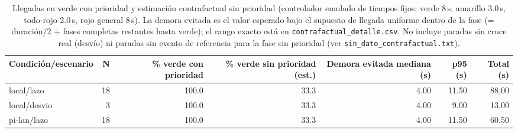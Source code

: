 \begin{table}[H]
\centering
\caption{Llegadas en verde con prioridad y estimación contrafactual sin prioridad (controlador emulado de tiempos fijos: verde 8\,s, amarillo 3.0\,s, todo-rojo 2.0\,s, rojo general 8\,s). La demora evitada es el valor esperado bajo el supuesto de llegada uniforme dentro de la fase (= duración/2 + fases completas restantes hasta verde); el rango exacto está en \texttt{contrafactual\_detalle.csv}. No incluye paradas sin cruce real (desvío) ni paradas sin evento de referencia para la fase sin prioridad (ver \texttt{sin\_dato\_contrafactual.txt}).}
\label{tab:contrafactual_verde}
\small
\begin{tabular}{lrrrrrr}
\toprule
\textbf{Condición/escenario} & \textbf{N} & \textbf{\% verde con prioridad} & \textbf{\% verde sin prioridad (est.)} & \textbf{Demora evitada mediana (s)} & \textbf{p95 (s)} & \textbf{Total (s)} \\
\midrule
local/lazo & 18 & 100.0 & 33.3 & 4.00 & 11.50 & 88.00 \\
local/desvio & 3 & 100.0 & 33.3 & 4.00 & 9.00 & 13.00 \\
pi-lan/lazo & 18 & 100.0 & 33.3 & 4.00 & 11.50 & 60.50 \\
\bottomrule
\end{tabular}
\end{table}
